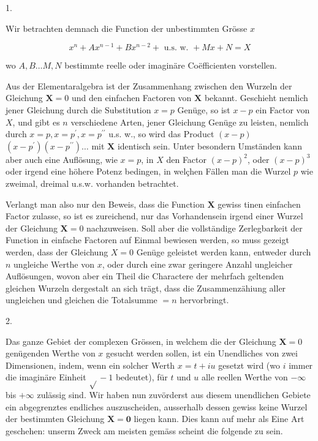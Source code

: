 \documentclass[10pt]{article}
\begin{document}
1.

Wir betrachten demnach die Function der unbestimmten Grösse \(x\)

\[
x^{n}+A x^{n-1}+B x^{n-2}+\text { u.s. w. }+M x+N=X
\]

wo \(A, B \ldots M, N\) bestimmte reelle oder imaginäre Coëfficienten vorstellen.

Aus der Elementaralgebra ist der Zusammenhang zwischen den Wurzeln der Gleichung \(\boldsymbol{X}=0\) und den einfachen Factoren von \(\boldsymbol{X}\) bekannt. Geschieht nemlich jener Gleichung durch die Substitution \(x=p\) Genüge, so ist \(x-p\) ein Factor von \(X\), und gibt es \(n\) verschiedene Arten, jener Gleichung Genüge zu leisten, nemlich durch \(x=p, x=p^{\prime}, x=p^{\prime \prime}\) u.s. w., so wird das Product \((x-p)\) \(\left(x-p^{\prime}\right)\left(x-p^{\prime \prime}\right) \ldots\) mit \(\boldsymbol{X}\) identisch sein. Unter besondern Umständen kann aber auch eine Auflösung, wie \(x=p\), in \(X\) den Factor \((x-p)^{2}\), oder \((x-p)^{3}\) oder irgend eine höhere Potenz bedingen, in welçhen Fällen man die Wurzel \(p\) wie zweimal, dreimal u.s.w. vorhanden betrachtet.

Verlangt man also nur den Beweis, dass die Function \(\boldsymbol{X}\) gewiss tinen einfachen Factor zulasse, so ist es zureichend, nur das Vorhandensein irgend einer Wurzel der Gleichung \(\boldsymbol{X}=0\) nachzuweisen. Soll aber die vollständige Zerlegbarkeit der Function in einfache Factoren auf Einmal bewiesen werden, so muss gezeigt werden, dass der Gleichung \(X=0\) Genüge geleistet werden kann, entweder durch \(n\) ungleiche Werthe von \(x\), oder durch eine zwar geringere Anzahl ungleicher Auflösungen, wovon aber ein Theil die Charactere der mehrfach geltenden gleichen Wurzeln dergestalt an sich trägt, dass die Zusammenzähiung aller ungleichen und gleichen die Totalsumme \(=n\) hervorbringt.

2.

Das ganze Gebiet der complexen Grössen, in welchem die der Gleichung \(\boldsymbol{X}=0\) genügenden Werthe von \(x\) gesucht werden sollen, ist ein Unendliches von zwei Dimensionen, indem, wenn ein solcher Werth \(x=t+i u\) gesetzt wird (wo \(i\) immer die imaginäre Einheit \(\sqrt{ }-1\) bedeutet), für \(t\) und \(u\) alle reellen Werthe von \(-\infty\) bis \(+\infty\) zulässig sind. Wir haben nun zuvörderst aus diesem unendlichen Gebiete ein abgegrenztes endliches auszuscheiden, ausserhalb dessen gewiss keine Wurzel der bestimmten Gleichung \(\mathbf{X}=\mathbf{0}\) liegen kann. Dies kann auf mehr als Eine Art geschehen: unserm Zweck am meisten gemäss scheint die folgende zu sein.
\end{document}
